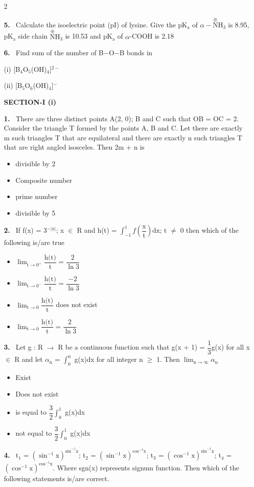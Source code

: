 \documentclass[10pt]{extarticle}
\newcommand{\partsec}[2]{\par\medskip\noindent{\large\bfseries PART-#1: #2}\par\smallskip}
\newcommand{\sect}[1]{\par\smallskip\noindent\textbf{#1}\par}
\newcommand{\qn}[1]{\par\smallskip\noindent\textbf{#1.}~}
\newenvironment{qoptions}{\begin{itemize}[leftmargin=1.8em,itemsep=1pt,topsep=2pt,label={}]}{\end{itemize}}
\newcommand{\opt}[2]{\item[(#1)] #2}
\begin{document}
\begin{multicols}{2}
\qn{5} Calculate the isoelectric point (pI) of lysine. Give the pK$_\text{a}$ of $\alpha-\overset{\oplus}{\text{N}}\text{H}_3$ is 8.95, pK$_\text{a}$ side chain $\overset{\oplus}{\text{N}}\text{H}_3$ is 10.53 and pK$_\text{a}$ of $\alpha$-COOH is 2.18
\qn{6} Find sum of the number of B$-$O$-$B bonds in\par
(i) [B$_4$O$_5$(OH)$_4$]$^{2-}$\par
(ii) [B$_5$O$_6$(OH)$_4$]$^{-}$
\raggedcolumns
\partsec{3}{MATHEMATICS}
\sect{SECTION-I (i)}
\qn{1} There are three distinct points A(2, 0); B and C such that OB = OC = 2. Consider the triangle T formed by the points A, B and C. Let there are exactly m such triangles T that are equilateral and there are exactly n such triangles T that are right angled isosceles. Then 2m + n is
\begin{qoptions}
\opt{A}{divisible by 2}
\opt{B}{Composite number}
\opt{C}{prime number}
\opt{D}{divisible by 5}
\end{qoptions}
\qn{2} If f(x) = 3$^{-|\text{x}|}$; x $\in$ R and h(t) = $\displaystyle\int_{-1}^{1} f\left(\dfrac{\text{x}}{\text{t}}\right)\text{dx}$; t $\neq$ 0 then which of the following is/are true
\begin{qoptions}
\opt{A}{$\displaystyle\lim_{\text{t}\to0^+}\dfrac{\text{h(t)}}{\text{t}}=\dfrac{2}{\ln 3}$}
\opt{B}{$\displaystyle\lim_{\text{t}\to0^-}\dfrac{\text{h(t)}}{\text{t}}=\dfrac{-2}{\ln 3}$}
\opt{C}{$\displaystyle\lim_{\text{t}\to0}\dfrac{\text{h(t)}}{\text{t}}$ does not exist}
\opt{D}{$\displaystyle\lim_{\text{t}\to0}\dfrac{\text{h(t)}}{\text{t}}=\dfrac{2}{\ln 3}$}
\end{qoptions}
\qn{3} Let g : R $\to$ R be a continuous function such that g(x + 1) = $\dfrac{1}{3}$g(x) for all x $\in$ R and let $\alpha_\text{n}$ = $\displaystyle\int_0^\text{n}$ g(x)dx for all integer n $\geqslant$ 1. Then $\displaystyle\lim_{\text{n}\to\infty}\alpha_\text{n}$
\begin{qoptions}
\opt{A}{Exist}
\opt{B}{Does not exist}
\opt{C}{is equal to $\dfrac{3}{2}\displaystyle\int_0^1$ g(x)dx}
\opt{D}{not equal to $\dfrac{3}{2}\displaystyle\int_0^1$ g(x)dx}
\end{qoptions}
\qn{4} t$_1$ = $\left(\sin^{-1}\text{x}\right)^{\sin^{-1}\text{x}}$; t$_2$ = $\left(\sin^{-1}\text{x}\right)^{\cos^{-1}\text{x}}$; t$_3$ = $\left(\cos^{-1}\text{x}\right)^{\sin^{-1}\text{x}}$; t$_4$ = $\left(\cos^{-1}\text{x}\right)^{\cos^{-1}\text{x}}$. Where sgn(x) represents signum function. Then which of the following statements is/are correct.
\begin{qoptions}

\end{qoptions}
\end{multicols}
\end{document}
